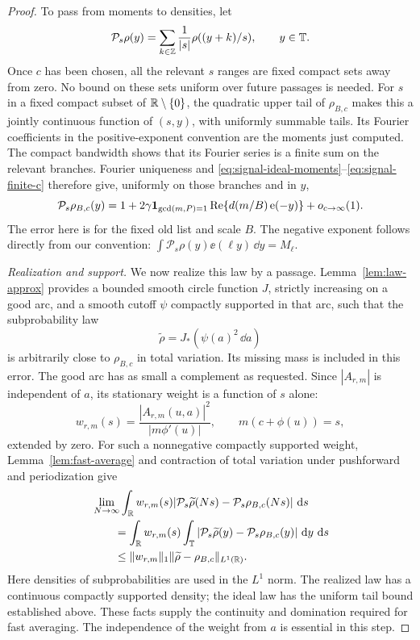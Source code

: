 \begin{proof}
To pass from moments to densities, let
\[
\mathcal P_s\rho(y)
   =\sum_{k\in\mathbb Z}\frac1{|s|}\rho((y+k)/s),\qquad y\in\mathbb T.
\]
Once $c$ has been chosen, all the relevant $s$ ranges are fixed compact
sets away from zero.  No bound on these sets uniform over future
passages is needed.
For $s$ in a fixed compact subset of $\mathbb R\setminus\{0\}$, the quadratic
upper tail of $\rho_{B,c}$ makes this a jointly continuous function of
$(s,y)$, with uniformly summable tails.  Its Fourier coefficients in
the positive-exponent convention are the moments just computed.
The compact bandwidth shows that its Fourier series is a finite sum
on the relevant branches.  Fourier uniqueness and
\eqref{eq:signal-ideal-moments}--\eqref{eq:signal-finite-c} therefore
give, uniformly on those branches and in $y$,
\begin{equation}
 \mathcal P_s\rho_{B,c}(y)
 =1+2\gamma\mathbf 1_{\gcd(m,P)=1}\operatorname{Re}\{d(m/B)\operatorname{e}(-y)\}
       +o_{c\to\infty}(1).
 \label{eq:signal-periodic-density}
\end{equation}
The error here is for the fixed old list and scale $B$.
The negative exponent follows directly from our convention:
$\int\mathcal P_s\rho(y)\ee(\ell y)\,\dd y=M_\ell$.

\emph{Realization and support.}
We now realize this law by a passage.  Lemma~\ref{lem:law-approx}
provides a bounded smooth circle function $J$, strictly increasing on
a good arc, and a smooth cutoff $\psi$ compactly supported in that arc,
such that the subprobability law
\[
 \widetilde\rho=J_*(\psi(a)^2\,\dd a)
\]
is arbitrarily close to $\rho_{B,c}$ in total variation.  Its missing
mass is included in this error.  The good arc has as small a complement
as requested.  Since $|A_{r,m}|$ is independent of $a$, its stationary
weight is a function of $s$ alone:
\[
 w_{r,m}(s)=\frac{|A_{r,m}(u,a)|^2}{|m\phi'(u)|},
 \qquad m(c+\phi(u))=s,
\]
extended by zero.  For such a nonnegative compactly supported weight,
Lemma~\ref{lem:fast-average} and contraction of total variation under
pushforward and periodization give
\begin{align}
 &\lim_{N\to\infty}\int_\mathbb R w_{r,m}(s)
   |\mathcal P_s\widetilde\rho(Ns)
               -\mathcal P_s\rho_{B,c}(Ns)|\,\,\mathrm d s \notag\\
 &\qquad=\int_\mathbb R w_{r,m}(s)\int_\mathbb T
   |\mathcal P_s\widetilde\rho(y)
               -\mathcal P_s\rho_{B,c}(y)|\,\,\mathrm d y\,\,\mathrm d s \notag\\
 &\qquad\le\|w_{r,m}\|_1\|\widetilde\rho-\rho_{B,c}\|_{L^1(\mathbb R)}.
 \label{eq:signal-law-comparison}
\end{align}
Here densities of subprobabilities are used in the $L^1$ norm.
The realized law has a continuous compactly supported density; the
ideal law has the uniform tail bound established above.  These facts
supply the continuity and domination required for fast averaging.
The independence of the weight from $a$ is essential in this step.


\end{proof}
